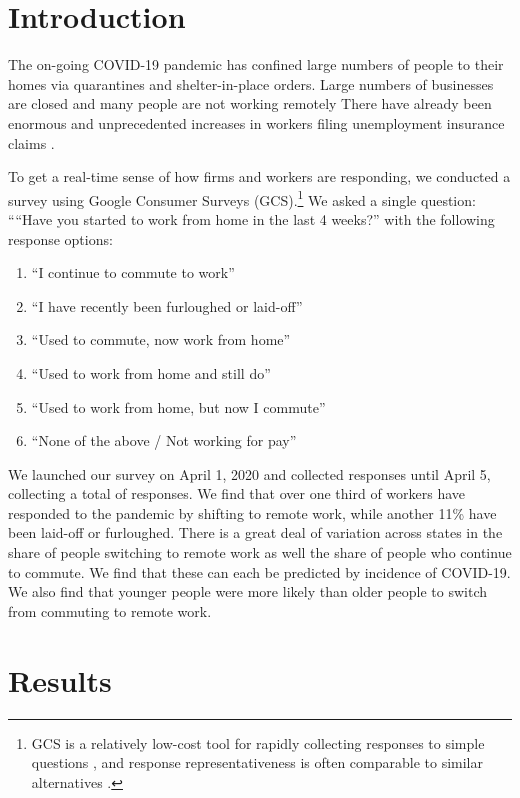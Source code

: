 \documentclass[12pt]{article}
\newcommand{\covid}{COVID-19}
\begin{document}
\onehalfspacing 

\section{Introduction}
The on-going \covid{} pandemic has confined large numbers of people to their homes via quarantines and shelter-in-place orders.
Large numbers of businesses are closed and many people are not working remotely
There have already been enormous and unprecedented increases in workers filing unemployment insurance claims \citep{goldsmith2020}. 

To get a real-time sense of how firms and workers are responding, we conducted a survey using Google Consumer Surveys (GCS).\footnote{
GCS is a relatively low-cost tool for rapidly collecting responses to simple questions \cite{stephens2014hands}, and response representativeness is often comparable to similar alternatives \citep{santoso2016survey, brynjolfsson2019using}.}  We asked a single question:
````Have you started to work from home in the last 4 weeks?''
with the following response options: 
\begin{enumerate} 
\item ``I continue to commute to work''
\item ``I have recently been furloughed or laid-off''
\item ``Used to commute, now work from home''   
\item ``Used to work from home and still do''       
\item ``Used to work from home, but now I commute''
\item ``None of the above / Not working for pay''
\end{enumerate} 


We launched our survey on April 1, 2020 and collected responses until April 5, collecting a total of \numObs{} responses.
We find that over one third of workers have responded to the pandemic by shifting to remote work, while another 11\% have been laid-off or furloughed.
There is a great deal of variation across states in the share of people switching to remote work as well the share of people who continue to commute. We find that these can each be predicted by incidence of COVID-19.  We also find that younger people were more likely than older people to switch from commuting to remote work.

\section{Results}
\end{document}
